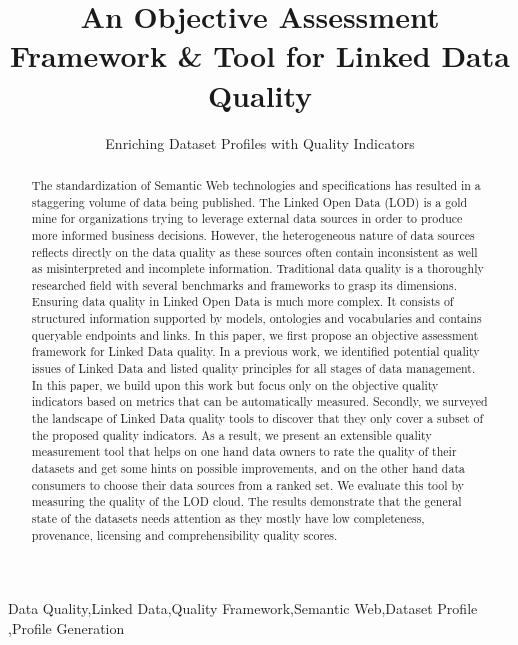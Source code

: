 \documentclass[onecolumn, crcready]{iosart2c}
\begin{document}
\begin{frontmatter}


\title{An Objective Assessment Framework \& Tool for Linked Data Quality}
\subtitle{Enriching Dataset Profiles with Quality Indicators}


\begin{abstract}
The standardization of Semantic Web technologies and specifications has resulted in a staggering volume of data being published. The Linked Open Data (LOD) is a gold mine for organizations trying to leverage external data sources in order to produce more informed business decisions. However, the heterogeneous nature of data sources reflects directly on the data quality as these sources often contain inconsistent as well as misinterpreted and incomplete information. Traditional data quality is a thoroughly researched field with several benchmarks and frameworks to grasp its dimensions. Ensuring data quality in Linked Open Data is much more complex. It consists of structured information supported by models, ontologies and vocabularies and contains queryable endpoints and links. In this paper, we first propose an objective assessment framework for Linked Data quality. In a previous work, we identified potential quality issues of Linked Data and listed quality principles for all stages of data management. In this paper, we build upon this work but focus only on the objective quality indicators based on metrics that can be automatically measured. Secondly, we surveyed the landscape of Linked Data quality tools to discover that they only cover a subset of the proposed quality indicators. As a result, we present an extensible quality measurement tool that helps on one hand data owners to rate the quality of their datasets and get some hints on possible improvements, and on the other hand data consumers to choose their data sources from a ranked set. We evaluate this tool by measuring the quality of the LOD cloud. The results demonstrate that the general state of the datasets needs attention as they mostly have low completeness, provenance, licensing and comprehensibility quality scores.
\end{abstract}

\begin{keyword}
Data Quality\sep Linked Data\sep Quality Framework\sep Semantic Web\sep Dataset Profile \sep Profile Generation
\end{keyword}
\end{frontmatter}
\end{document}
